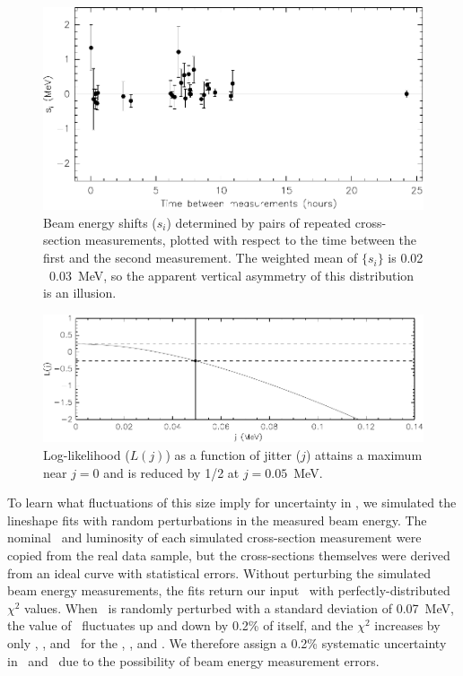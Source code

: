 \documentclass{cornell}
\begin{document}
\begin{figure}[p]
  \begin{center}
    \includegraphics[width=\linewidth]{plots/miscalhours}
  \end{center}
  \caption{\label{miscalhours} Beam energy shifts ($s_i$) determined
  by pairs of repeated cross-section measurements, plotted with
  respect to the time between the first and the second measurement.
  The weighted mean of $\{s_i\}$ is 0.02 \PM\ 0.03~MeV, so the apparent
  vertical asymmetry of this distribution is an illusion.}
\end{figure}

\begin{figure}[p]
  \begin{center}
    \includegraphics[width=\linewidth]{newplots/energylj}
  \end{center}
  \caption{\label{energylj} Log-likelihood ($L(j)$) as a function of
  jitter ($j$) attains a maximum near $j=0$ and is reduced by 1/2 at
  $j=0.05$~MeV.}
\end{figure}

To learn what fluctuations of this size imply for uncertainty in
\geehadtot, we simulated the lineshape fits with random perturbations
in the measured beam energy.  The nominal \ecm\ and luminosity of each
simulated cross-section measurement were copied from the real data
sample, but the cross-sections themselves were derived from an ideal
curve with statistical errors.  Without perturbing the simulated beam
energy measurements, the fits return our input \geehadtot\ with
perfectly-distributed $\chi^2$ values.  When \ecm\ is randomly
perturbed with a standard deviation of 0.07~MeV, the value of
\geehadtot\ fluctuates up and down by 0.2\% of itself, and the
$\chi^2$ increases by only \bork, \bork, and \bork\ for the \us, \uss,
and \usss.  \label{pag:notjitter} We therefore assign a 0.2\%
systematic uncertainty in \geehadtot\ and \gee\ due to the possibility
of beam energy measurement errors.
\end{document}
